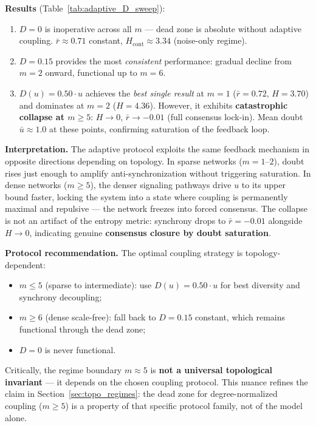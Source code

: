 ﻿\documentclass[11pt]{article}
\begin{document}
\textbf{Results} (Table~\ref{tab:adaptive_D_sweep}):

\begin{enumerate}
\item $D = 0$ is inoperative across all $m$ --- dead zone is absolute without adaptive coupling. $\bar{r} \approx 0.71$ constant, $H_{\text{cont}} \approx 3.34$ (noise-only regime).
\item $D = 0.15$ provides the most \emph{consistent} performance: gradual decline from $m = 2$ onward, functional up to $m = 6$.
\item $D(u) = 0.50 \cdot u$ achieves the \emph{best single result} at $m = 1$ ($\bar{r} = 0.72$, $H = 3.70$) and dominates at $m = 2$ ($H = 4.36$). However, it exhibits \textbf{catastrophic collapse at $m \geq 5$}: $H \to 0$, $\bar{r} \to -0.01$ (full consensus lock-in). Mean doubt $\bar{u} \approx 1.0$ at these points, confirming saturation of the feedback loop.
\end{enumerate}

\textbf{Interpretation.} The adaptive protocol exploits the same feedback mechanism in opposite directions depending on topology. In sparse networks ($m = 1$--$2$), doubt rises just enough to amplify anti-synchronization without triggering saturation. In dense networks ($m \geq 5$), the denser signaling pathways drive $u$ to its upper bound faster, locking the system into a state where coupling is permanently maximal and repulsive --- the network freezes into forced consensus. The collapse is not an artifact of the entropy metric: synchrony drops to $\bar{r} = -0.01$ alongside $H \to 0$, indicating genuine \textbf{consensus closure by doubt saturation}.

\textbf{Protocol recommendation.} The optimal coupling strategy is topology-dependent:
\begin{itemize}
\item $m \leq 5$ (sparse to intermediate): use $D(u) = 0.50 \cdot u$ for best diversity and synchrony decoupling;
\item $m \geq 6$ (dense scale-free): fall back to $D = 0.15$ constant, which remains functional through the dead zone;
\item $D = 0$ is never functional.
\end{itemize}

Critically, the regime boundary $m \approx 5$ is \textbf{not a universal topological invariant} --- it depends on the chosen coupling protocol. This nuance refines the claim in Section~\ref{sec:topo_regimes}: the dead zone for degree-normalized coupling ($m \geq 5$) is a property of that specific protocol family, not of the model alone.
\end{document}
